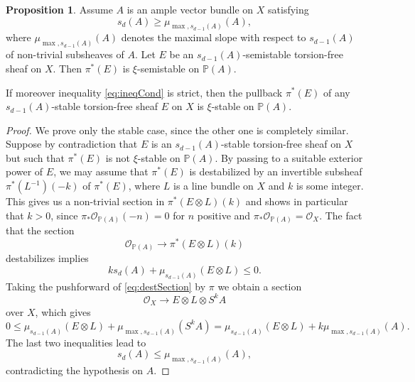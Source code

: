 \documentclass[a4,reqno]{amsart}
\theoremstyle{definition}
\newtheorem{proposition}[theorem]{Proposition}
\def\cO{\mathcal O}
\renewcommand{\P}{\mathbb{P}}
\numberwithin{equation}{section}
\begin{document}
\begin{proposition}\label{prop:ss-projective-bundle}
 Assume  $A$ is an ample vector bundle on $X$ satisfying
\begin{equation}\label{eq:ineqCond}
    s_d(A)\ge \mu_{\max,s_{d-1}(A)}(A),
\end{equation}
where $\mu_{\max,s_{d-1}(A)}(A)$ denotes the maximal slope with respect to $s_{d-1}(A)$ of non-trivial subsheaves of $A$.
   Let $E$ be an $s_{d-1}(A)$-semistable torsion-free sheaf on $X$. Then $\pi^*(E)$ is $\xi$-semistable on $\P(A)$. 

If moreover inequality \eqref{eq:ineqCond} is strict, then the pullback $\pi^*(E)$ of any $s_{d-1}(A)$-stable torsion-free sheaf $E$ on $X$ is  $\xi$-stable on $\P(A)$. 
\end{proposition}
\begin{proof}
We prove only the stable case, since the other one is completely similar. Suppose by contradiction that $E$ is an $s_{d-1}(A)$-stable torsion-free sheaf on $X$ but such that $\pi^*(E)$ is not $\xi$-stable on $\P(A)$. By passing to a suitable exterior power of $E$, we may assume that $\pi^*(E)$ is destabilized by an invertible subsheaf $\pi^*(L^{-1})(-k)$ of $\pi^*(E)$, where $L$ is a line bundle on $X$ and $k$ is some integer. This gives us a non-trivial section in $\pi^*(E\otimes L)(k)$ and shows in particular that $k>0$, since $\pi_*\cO_{\P(A)}(-n)=0$ for $n$ positive and $\pi_*\cO_{\P(A)}=\cO_X$. 
The fact that the section 
\begin{equation}\label{eq:destSection}
\cO_{\P(A)}\to \pi^*(E\otimes L)(k)   
\end{equation}
destabilizes implies 
$$k{s_d(A)}+\mu_{s_{d-1}(A)}(E \otimes L) \le 0.$$
Taking the pushforward of \eqref{eq:destSection} by $\pi$ we obtain a section
\[
    \cO_X \to E \otimes L \otimes S^kA
\]
over $X$, which gives
\[
    0 \le \mu_{s_{d-1}(A)}(E \otimes L) + \mu_{\max,s_{d-1}(A)}(S^kA) = \mu_{s_{d-1}(A)}(E \otimes L) + k\mu_{\max,s_{d-1}(A)}(A).
\]
The last two inequalities lead to
\[
    s_d(A) \le \mu_{\max,s_{d-1}(A)}(A),
\]
contradicting the hypothesis on $A$.
\end{proof}
\end{document}
